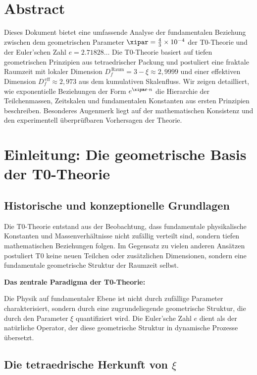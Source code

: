 \section*{Abstract}
		Dieses Dokument bietet eine umfassende Analyse der fundamentalen Beziehung zwischen dem geometrischen Parameter $\xipar = \frac{4}{3} \times 10^{-4}$ der T0-Theorie und der Euler'schen Zahl $e = 2.71828\ldots$ Die T0-Theorie basiert auf tiefen geometrischen Prinzipien aus tetraedrischer Packung und postuliert eine fraktale Raumzeit mit lokaler Dimension $D_f^{\,\text{Raum}} = 3 - \xi \approx 2{,}9999$ und einer effektiven Dimension $D_f^{\,\text{eff}} \approx 2{,}973$ aus dem kumulativen Skalenfluss. Wir zeigen detailliert, wie exponentielle Beziehungen der Form $e^{\xipar \cdot n}$ die Hierarchie der Teilchenmassen, Zeitskalen und fundamentalen Konstanten aus ersten Prinzipien beschreiben. Besonderes Augenmerk liegt auf der mathematischen Konsistenz und den experimentell überprüfbaren Vorhersagen der Theorie.

	
	
	\section{Einleitung: Die geometrische Basis der T0-Theorie}
	
	\subsection{Historische und konzeptionelle Grundlagen}
	
	Die T0-Theorie entstand aus der Beobachtung, dass fundamentale physikalische Konstanten und Massenverhältnisse nicht zufällig verteilt sind, sondern tiefen mathematischen Beziehungen folgen. Im Gegensatz zu vielen anderen Ansätzen postuliert T0 keine neuen Teilchen oder zusätzlichen Dimensionen, sondern eine fundamentale geometrische Struktur der Raumzeit selbst.
	
	\begin{erkenntnis}
		\textbf{Das zentrale Paradigma der T0-Theorie:}
		
		Die Physik auf fundamentaler Ebene ist nicht durch zufällige Parameter charakterisiert, sondern durch eine zugrundeliegende geometrische Struktur, die durch den Parameter $\xi$ quantifiziert wird. Die Euler'sche Zahl $e$ dient als der natürliche Operator, der diese geometrische Struktur in dynamische Prozesse übersetzt.
	\end{erkenntnis}
	
	\subsection{Die tetraedrische Herkunft von $\xi$}
	
